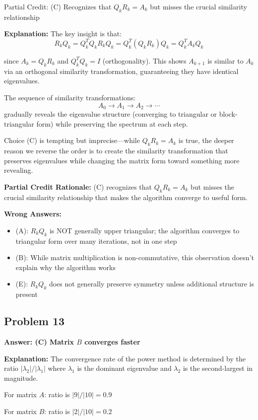 \documentclass[12pt]{amsart}
\newcommand{\correct}[1]{{\color{correctgreen}\textbf{#1}}}
\newcommand{\partcred}[1]{{\color{partialblue}#1}}
\begin{document}
\partcred{Partial Credit: (C) Recognizes that $Q_k R_k = A_k$ but misses the crucial similarity relationship}

\textbf{Explanation:} The key insight is that:
$$R_k Q_k = Q_k^T Q_k R_k Q_k = Q_k^T (Q_k R_k) Q_k = Q_k^T A_k Q_k$$

since $A_k = Q_k R_k$ and $Q_k^T Q_k = I$ (orthogonality). This shows $A_{k+1}$ is similar to $A_k$ via an orthogonal similarity transformation, guaranteeing they have identical eigenvalues.

The sequence of similarity transformations:
$$A_0 \to A_1 \to A_2 \to \cdots$$
gradually reveals the eigenvalue structure (converging to triangular or block-triangular form) while preserving the spectrum at each step.

Choice (C) is tempting but imprecise—while $Q_k R_k = A_k$ is true, the deeper reason we reverse the order is to create the similarity transformation that preserves eigenvalues while changing the matrix form toward something more revealing.

\textbf{Partial Credit Rationale:} (C) recognizes that $Q_k R_k = A_k$ but misses the crucial similarity relationship that makes the algorithm converge to useful form.

\textbf{Wrong Answers:}
\begin{itemize}
\item (A): $R_k Q_k$ is NOT generally upper triangular; the algorithm converges to triangular form over many iterations, not in one step
\item (B): While matrix multiplication is non-commutative, this observation doesn't explain why the algorithm works
\item (E): $R_k Q_k$ does not generally preserve symmetry unless additional structure is present
\end{itemize}

\subsection*{Problem 13}
\correct{Answer: (C) Matrix $B$ converges faster}

\textbf{Explanation:} The convergence rate of the power method is determined by the ratio $|\lambda_2|/|\lambda_1|$ where $\lambda_1$ is the dominant eigenvalue and $\lambda_2$ is the second-largest in magnitude.

For matrix $A$: ratio is $|9|/|10| = 0.9$

For matrix $B$: ratio is $|2|/|10| = 0.2$
\end{document}
